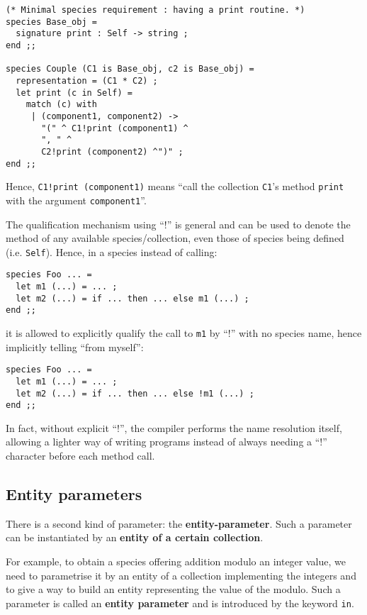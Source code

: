 {\scriptsize
\begin{lstlisting}
(* Minimal species requirement : having a print routine. *)
species Base_obj =
  signature print : Self -> string ;
end ;;

species Couple (C1 is Base_obj, c2 is Base_obj) =
  representation = (C1 * C2) ;
  let print (c in Self) =
    match (c) with
     | (component1, component2) ->
       "(" ^ C1!print (component1) ^
       ", " ^
       C2!print (component2) ^")" ;
end ;;
\end{lstlisting}}

Hence, {\tt C1!print (component1)} means ``call the collection
{\tt C1}'s method {\tt print} with the argument {\tt component1}''.

The qualification mechanism using ``!'' is general and can be used to
denote the method of any available species/collection, even those of
species being defined (i.e. {\tt Self}). Hence, in a species instead of calling:

{\scriptsize
\begin{lstlisting}
species Foo ... =
  let m1 (...) = ... ;
  let m2 (...) = if ... then ... else m1 (...) ;
end ;;
\end{lstlisting}}

it is allowed to explicitly qualify the call to {\tt m1} by ``!''
with no species name, hence implicitly telling ``from myself'':

{\scriptsize
\begin{lstlisting}
species Foo ... =
  let m1 (...) = ... ;
  let m2 (...) = if ... then ... else !m1 (...) ;
end ;;
\end{lstlisting}}

In fact, without explicit ``!'', the {\focal} compiler performs the
name resolution itself, allowing a lighter way of writing programs
instead of always needing a ``!'' character before each method call.



\subsection{Entity parameters}
\label{entity-parameter}
There is a second kind of parameter: the {\bf entity-parameter}. Such
a parameter can be instantiated by an {\bf entity of a certain
collection}.

For example, to obtain a species offering addition modulo an
integer value, we need to parametrise it by an entity of a collection
implementing the integers and to give a way to build an entity
representing the value of the modulo. Such a parameter is called an
{\bf entity parameter} and is introduced by the keyword {\tt in}.

